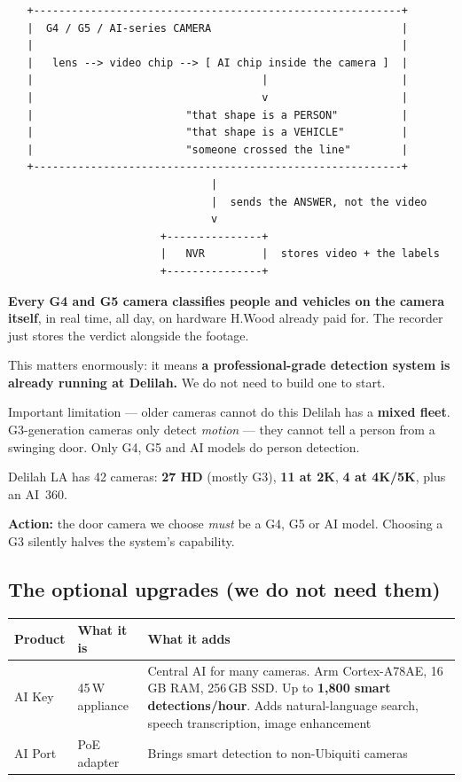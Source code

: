\documentclass[11pt,a4paper]{article}
\begin{document}
\begin{verbatim}
   +----------------------------------------------------------+
   |  G4 / G5 / AI-series CAMERA                              |
   |                                                          |
   |   lens --> video chip --> [ AI chip inside the camera ]  |
   |                                    |                     |
   |                                    v                     |
   |                        "that shape is a PERSON"          |
   |                        "that shape is a VEHICLE"         |
   |                        "someone crossed the line"        |
   +----------------------------------------------------------+
                                |
                                |  sends the ANSWER, not the video
                                v
                        +---------------+
                        |   NVR         |  stores video + the labels
                        +---------------+
\end{verbatim}

\textbf{Every G4 and G5 camera classifies people and vehicles on the camera
itself}, in real time, all day, on hardware H.Wood already paid for. The
recorder just stores the verdict alongside the footage.

This matters enormously: it means \textbf{a professional-grade detection
system is already running at Delilah.} We do not need to build one to start.

\begin{alert}{Important limitation --- older cameras cannot do this}
Delilah has a \textbf{mixed fleet}. G3-generation cameras only detect
\emph{motion} --- they cannot tell a person from a swinging door. Only
G4, G5 and AI models do person detection.

\vspace{4pt}
Delilah LA has 42 cameras: \textbf{27 HD} (mostly G3), \textbf{11 at 2K},
\textbf{4 at 4K/5K}, plus an AI~360.

\vspace{4pt}
\textbf{Action:} the door camera we choose \emph{must} be a G4, G5 or AI
model. Choosing a G3 silently halves the system's capability.
\end{alert}

\subsection{The optional upgrades (we do not need them)}

\begin{center}
\begin{tabular}{@{}llp{7.4cm}@{}}
\toprule
\textbf{Product} & \textbf{What it is} & \textbf{What it adds} \\
\midrule
AI Key  & 45\,W appliance & Central AI for many cameras. Arm Cortex-A78AE,
16\,GB RAM, 256\,GB SSD. Up to \textbf{1{,}800 smart detections/hour}.
Adds natural-language search, speech transcription, image enhancement \\
AI Port & PoE adapter & Brings smart detection to non-Ubiquiti cameras \\
\bottomrule
\end{tabular}
\end{center}
\end{document}
